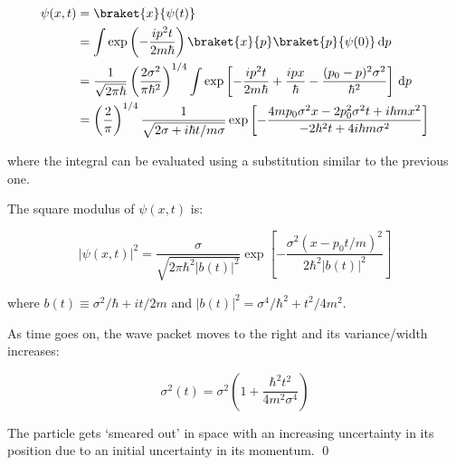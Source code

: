 \documentclass[12pt]{article}
\begin{document}
\begin{equation}
    \begin{split}
        \psi(x, t) &= \braket{x}{\psi(t)} \\
        &= \int \exp \left( -\frac{ip^{2}t}{2m\hbar} \right) \braket{x}{p} \braket{p}{\psi(0)} \, \mathrm{d}p  \\
        &= \frac{1}{\sqrt{2\pi\hbar}} \left( \frac{2\sigma^{2}}{\pi \hbar^{2}} \right)^{1/4} \int \exp \left[ -\frac{ip^{2}t}{2m\hbar} + \frac{ipx}{\hbar} - \frac{(p_{0} - p)^{2}\sigma^{2}}{\hbar^{2}} \right] \, \mathrm{d}p \\
        &= \left( \frac{2}{\pi} \right)^{1/4} \frac{1}{\sqrt{2\sigma + i\hbar t/m\sigma}} \exp \left[ -\frac{4mp_{0} \sigma^{2} x - 2p_{0}^{2} \sigma^{2} t + i\hbar mx^{2}}{-2\hbar^{2} t + 4i\hbar m \sigma^{2}} \right]
    \end{split}
\end{equation}

where the integral can be evaluated using a substitution similar to the previous one.

The square modulus of $\psi(x, t)$ is:

\begin{equation}
    \left| \psi(x, t) \right|^{2} = \frac{\sigma}{\sqrt{2\pi \hbar^{2} \left\lvert b(t) \right\rvert^{2}}} \exp \left[ -\frac{\sigma^{2} (x - p_{0}t/m)^{2}}{2\hbar^{2} \left\lvert b(t) \right\rvert^{2}} \right]
\end{equation}

where $b(t) \equiv \sigma^{2}/\hbar + it/2m$ and $\left\lvert b(t) \right\rvert^{2} = \sigma^{4}/\hbar^{2} + t^{2}/4m^{2}$.

As time goes on, the wave packet moves to the right and its variance/width increases:

\begin{equation}
    \sigma^{2}(t) = \sigma^{2} \left( 1 + \frac{\hbar^{2}t^{2}}{4m^{2}\sigma^{4}} \right)
\end{equation}

The particle gets `smeared out' in space with an increasing uncertainty in its position due to an initial uncertainty in its momentum.
\qed
\end{document}
